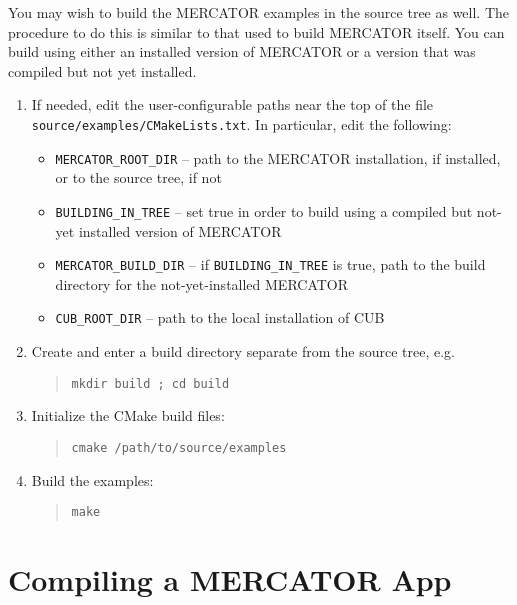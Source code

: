\documentclass[11pt]{article}
\begin{document}
You may wish to build the MERCATOR examples in the source tree as
well.  The procedure to do this is similar to that used to build
MERCATOR itself.  You can build using either an installed version of
MERCATOR or a version that was compiled but not yet installed.
\begin{enumerate}

\item If needed, edit the user-configurable paths near the top of the
  file \texttt{source/examples/CMakeLists.txt}.  In particular, edit
  the following:

 \begin{itemize}
   \item \texttt{MERCATOR_ROOT_DIR} -- path to the MERCATOR installation,
      if installed, or to the source tree, if not

   \item \texttt{BUILDING_IN_TREE} -- 
      set true in order to build using a compiled but not-yet installed
      version of MERCATOR

   \item \texttt{MERCATOR_BUILD_DIR} --
      if \texttt{BUILDING_IN_TREE} is true, path to the build directory
      for the not-yet-installed MERCATOR

   \item \texttt{CUB_ROOT_DIR} -- path to the local installation of CUB
 \end{itemize}

\item Create and enter a build directory separate from the source tree, e.g.
\begin{quote}
\texttt{mkdir build ; cd build}
\end{quote}

\item Initialize the CMake build files:
\begin{quote}
\texttt{cmake /path/to/source/examples}
\end{quote}

\item Build the examples:
\begin{quote}
\texttt{make}
\end{quote}

\end{enumerate}

\newpage

\section{Compiling a MERCATOR App}
\end{document}
